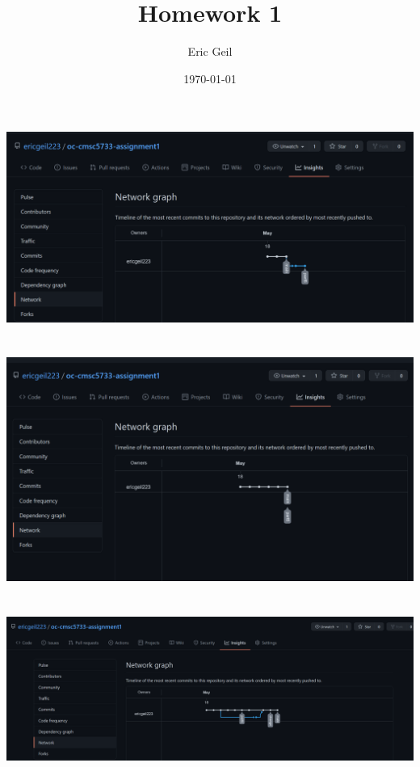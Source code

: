 \documentclass{article}
\title{Homework 1}
\author{Eric Geil}
\date\today
\begin{document}
\maketitle %

\section{}
\includegraphics[width=1.0\textwidth]{2.png}
\section{}
\includegraphics[width=1.0\textwidth]{3.png}
\section{}
\includegraphics[width=1.0\textwidth]{4.png}
\end{document}
